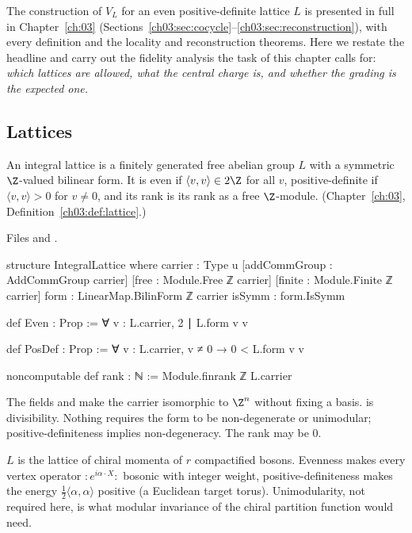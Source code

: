 The construction of $V_L$ for an even positive-definite lattice $L$ is presented in full in
Chapter~\ref{ch:03} (Sections~\ref{ch03:sec:cocycle}--\ref{ch03:sec:reconstruction}), with every
definition and the locality and reconstruction theorems. Here we restate the headline and carry out the
fidelity analysis the task of this chapter calls for: \emph{which lattices are allowed, what the central
charge is, and whether the grading is the expected one.}

\subsection{Lattices}

\begin{definition}\label{l05:def:lattice}
An integral lattice is a finitely generated free abelian group $L$ with a symmetric $\Z$-valued bilinear form.
It is even if $\langle v,v\rangle\in2\Z$ for all $v$, positive-definite if $\langle v,v\rangle>0$ for $v\ne0$, and
its rank is its rank as a free $\Z$-module. (Chapter~\ref{ch:03}, Definition~\ref{ch03:def:lattice}.)
\end{definition}

\noindent Files  and .
\begin{leancode}
structure IntegralLattice where
  carrier : Type u
  [addCommGroup : AddCommGroup carrier]
  [free : Module.Free ℤ carrier]
  [finite : Module.Finite ℤ carrier]
  form : LinearMap.BilinForm ℤ carrier
  isSymm : form.IsSymm

def Even : Prop := ∀ v : L.carrier, 2 ∣ L.form v v

def PosDef : Prop := ∀ v : L.carrier, v ≠ 0 → 0 < L.form v v

noncomputable def rank : ℕ := Module.finrank ℤ L.carrier
\end{leancode}

\begin{dictionary}
The fields  and  make the carrier isomorphic to $\Z^n$ without fixing a basis.
 is divisibility. Nothing requires the form to be non-degenerate or unimodular; positive-definiteness
implies non-degeneracy. The rank may be $0$.
\end{dictionary}

\begin{physics}
$L$ is the lattice of chiral momenta of $r$ compactified bosons. Evenness makes every vertex operator
${:}e^{i\alpha\cdot X}{:}$ bosonic with integer weight, positive-definiteness makes the energy
$\frac12\langle\alpha,\alpha\rangle$ positive (a Euclidean target torus). Unimodularity, not required here, is
what modular invariance of the chiral partition function would need.
\end{physics}

